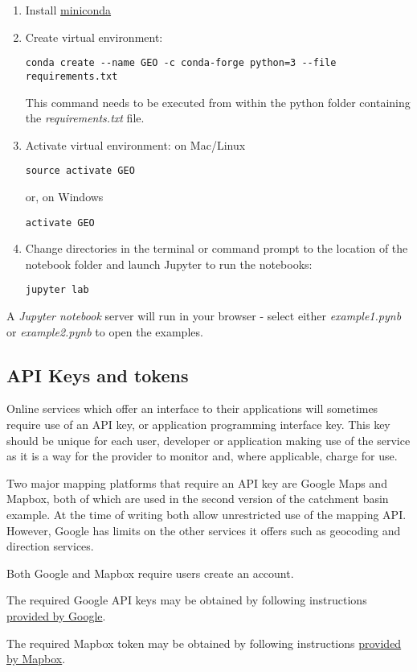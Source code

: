 \documentclass[utf8]{frontiers_suppmat} %
\begin{document}
\begin{enumerate}
\item  Install \href{https://docs.conda.io/en/latest/miniconda.html}{miniconda}
\item  Create virtual environment: 
\begin{verbatim}
conda create --name GEO -c conda-forge python=3 --file requirements.txt
\end{verbatim}

This command needs to be executed from within the python folder containing the {\em requirements.txt} file.

\item Activate virtual environment: 
on Mac/Linux
\begin{verbatim}
source activate GEO  
\end{verbatim}
or, on Windows
\begin{verbatim}
activate GEO 
\end{verbatim}
\item Change directories in the terminal or command prompt to the location of the
notebook folder and launch Jupyter to run the notebooks:
\begin{verbatim}
jupyter lab
\end{verbatim}
\end{enumerate}

A {\em Jupyter notebook} server will run in your browser - select
either {\em example1.pynb} or {\em example2.pynb}
to open the examples.


\subsection{API Keys and tokens}\label{api-keys}

Online services which offer an interface to their applications will
sometimes require use of an API key, or application programming
interface key. This key should be unique for each user, developer or
application making use of the service as it is a way for the provider to
monitor and, where applicable, charge for use.

Two major mapping platforms that require an API key are Google Maps
and Mapbox, both of which are used in the second version of the
catchment basin example. At the time of writing both allow
unrestricted use of the mapping API. However, Google has limits on the
other services it offers such as geocoding and direction services.

Both Google and Mapbox require users create an account.

The required Google API keys may be obtained by following instructions
\href{https://developers.google.com/maps/documentation/embed/get-api-key}{provided
  by Google}.

The required Mapbox token may be obtained by following instructions
\href{https://www.mapbox.com/account/access-tokens}{provided by
  Mapbox}.
\end{document}
